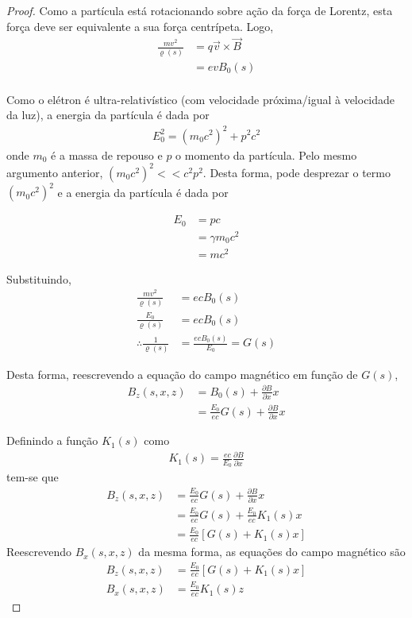 \begin{proof}
	Como a partícula está rotacionando sobre ação da força de Lorentz, esta força deve ser equivalente a sua força centrípeta. Logo,
	\begin{align*}
		\frac{mv^2}{\varrho(s)} &= q\vec{v}\times\vec{B}\\
							    &= evB_0(s)\\
	\end{align*}
	
	Como o elétron é ultra-relativístico (com velocidade próxima/igual à velocidade da luz), a energia da partícula é dada por
	\begin{align*}
		E_0^2 = (m_0 c^2)^2 + p^2c^2
	\end{align*}
	onde $m_0$ é a massa de repouso e $p$ o momento da partícula. Pelo mesmo argumento anterior, $(m_0c^2)^2 << c^2p^2$. Desta forma, pode desprezar o termo $(m_0c^2)^2$ e a energia da partícula é dada por
	
	\begin{align*}
		E_0 &= pc\\
			&= \gamma m_0 c^2\\
			&= mc^2
	\end{align*}
	
	Substituindo,
	\begin{align*}
			\frac{mv^2}{\varrho(s)} &= ecB_0(s)\\
			\frac{E_0}{\varrho(s)} &= ecB_0(s)\\
			\therefore \frac{1}{\varrho(s)} &= \frac{ecB_0(s)}{E_0} = G(s)
	\end{align*}
	
	Desta forma, reescrevendo a equação do campo magnético em função de $G(s)$,
	\begin{align*}
		B_z(s,x,z) &= B_0(s) + \frac{\partial B}{\partial x} x\\
				   &= \frac{E_0}{ec} G(s) + \frac{\partial B}{\partial x} x
	\end{align*}
	
	Definindo a função $K_1(s)$ como
	\begin{align*}
		K_1(s) = \frac{ec}{E_0} \frac{\partial B}{\partial x}
	\end{align*}
	tem-se que
	\begin{align*}
		B_z(s,x,z) &= \frac{E_0}{ec} G(s) + \frac{\partial B}{\partial x} x\\
				   &= \frac{E_0}{ec} G(s) + \frac{E_0}{ec} K_1(s) x\\
				   &= \frac{E_0}{ec} [G(s) + K_1(s) x]
	\end{align*}
	Reescrevendo $B_x(s,x,z)$ da mesma forma, as equações do campo magnético são
	\begin{align*}
		B_z(s,x,z) &= \frac{E_0}{ec} [G(s) + K_1(s) x]\\
		B_x(s,x,z) &= \frac{E_0}{ec} K_1(s) z
	\end{align*}
\end{proof}

